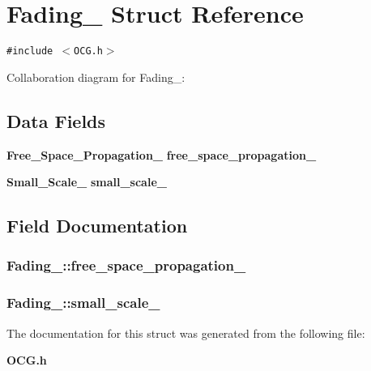 \section{Fading\_\- Struct Reference}
\label{structFading__}
{\tt \#include $<$OCG.h$>$}

Collaboration diagram for Fading\_\-:\subsection*{Data Fields}
\begin{CompactItemize}
\item 
{\bf Free\_\-Space\_\-Propagation\_\-} {\bf free\_\-space\_\-propagation\_\-}
\item 
{\bf Small\_\-Scale\_\-} {\bf small\_\-scale\_\-}
\end{CompactItemize}


\subsection{Field Documentation}
\subsubsection[{free\_\-space\_\-propagation\_\-}]{ {\bf Fading\_\-::free\_\-space\_\-propagation\_\-}}\label{structFading___53b6eeffbb7ccc4669eeea702e86f394}


\subsubsection[{small\_\-scale\_\-}]{ {\bf Fading\_\-::small\_\-scale\_\-}}\label{structFading___c6e3e8b36e83ca0e5e8c10ea5f495dd8}




The documentation for this struct was generated from the following file:\begin{CompactItemize}
\item 
{\bf OCG.h}\end{CompactItemize}
